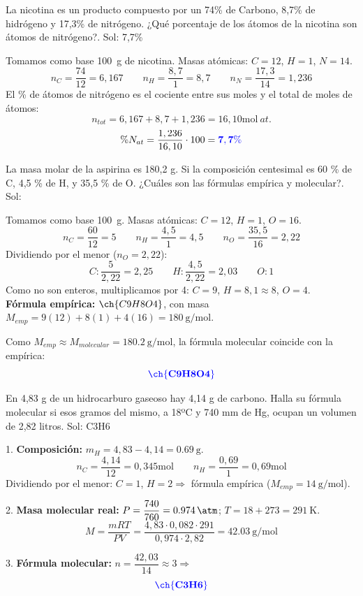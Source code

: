 \begin{exercise}
    La nicotina es un producto compuesto por un 74\% de Carbono, 8,7\% de hidrógeno y 17,3\% de nitrógeno. ¿Qué porcentaje de los átomos de la nicotina son átomos de nitrógeno?. Sol: 7,7\%
    \begin{solu}
        Tomamos como base \qty{100}{\g} de nicotina. Masas atómicas: $C=12$, $H=1$, $N=14$.
        \[ n_C = \dfrac{74}{12} = 6,167 \qquad n_H = \dfrac{8,7}{1} = 8,7 \qquad n_N = \dfrac{17,3}{14} = 1,236 \]
        El \% de átomos de nitrógeno es el cociente entre sus moles y el total de moles de átomos:
        \[ n_{tot} = 6,167 + 8,7 + 1,236 = 16,10 \si{\mol\ at.} \]
        \[ \%N_{at} = \dfrac{1,236}{16,10} \cdot 100 = \mathbf{\textcolor{blue}{7,7 \%}} \]
    \end{solu}
\end{exercise}

\begin{exercise}
    La masa molar de la aspirina es 180,2 g. Si la composición centesimal es 60 \% de C, 4,5 \% de H, y 35,5 \% de O. ¿Cuáles son las fórmulas empírica y molecular?. Sol: 
    \begin{solu}
        Tomamos como base \qty{100}{\g}. Masas atómicas: $C=12$, $H=1$, $O=16$.
        \[ n_C = \dfrac{60}{12} = 5 \qquad n_H = \dfrac{4,5}{1} = 4,5 \qquad n_O = \dfrac{35,5}{16} = 2,22 \]
        Dividiendo por el menor ($n_O = 2,22$):
        \[ C: \dfrac{5}{2,22} = 2,25 \qquad H: \dfrac{4,5}{2,22} = 2,03 \qquad O: 1 \]
        Como no son enteros, multiplicamos por 4: $C = 9$, $H = 8,1 \approx 8$, $O = 4$. \\
        \textbf{Fórmula empírica:} \(\ch{C9H8O4}\), con masa $M_{emp} = 9(12)+8(1)+4(16) = \qty{180}{\g\per\mol}$.

        Como $M_{emp} \approx M_{molecular} = \qty{180.2}{\g\per\mol}$, la fórmula molecular coincide con la empírica:
        \[ \mathbf{\textcolor{blue}{\ch{C9H8O4}}} \]
    \end{solu}
\end{exercise}


\begin{exercise}
    En 4,83 g de un hidrocarburo gaseoso hay 4,14 g de carbono. Halla su fórmula molecular si esos gramos del mismo, a 18ºC y 740 mm de Hg, ocupan un volumen de 2,82 litros. Sol: C3H6
    \begin{solu}
        1. \textbf{Composición:} $m_H = 4,83 - 4,14 = \qty{0,69}{\g}$.
        \[ n_C = \dfrac{4,14}{12} = 0,345 \si{\mol} \qquad n_H = \dfrac{0,69}{1} = 0,69 \si{\mol} \]
        Dividiendo por el menor: $C = 1$, $H = 2 \Rightarrow$ fórmula empírica  ($M_{emp} = \qty{14}{\g\per\mol}$).

        2. \textbf{Masa molecular real:} $P = \dfrac{740}{760} = \qty{0,974}{\atm}$; $T = 18+273 = \qty{291}{\K}$.
        \[ M = \dfrac{mRT}{PV} = \dfrac{4,83 \cdot 0,082 \cdot 291}{0,974 \cdot 2,82} = \qty{42,03}{\g\per\mol} \]

        3. \textbf{Fórmula molecular:} $n = \dfrac{42,03}{14} \approx 3 \Rightarrow$
        \[ \mathbf{\textcolor{blue}{\ch{C3H6}}} \]
    \end{solu}
\end{exercise}

